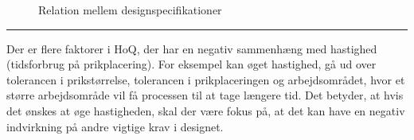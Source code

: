 \begin{figure}[H]
\caption{Relation mellem designspecifikationer} 
\label{Table: HOQ tag ny}
\end{figure} \plainbreak{-0.5}


Der er flere faktorer i HoQ, der har en negativ sammenhæng med hastighed (tidsforbrug på prikplacering). For eksempel kan øget hastighed, gå ud over tolerancen i prikstørrelse, tolerancen i prikplaceringen og arbejdsområdet, hvor et større arbejdsområde vil få  processen til at tage længere tid. Det betyder, at hvis det ønskes at øge hastigheden, skal der være fokus på, at det kan have en negativ indvirkning på andre vigtige krav i designet. 





